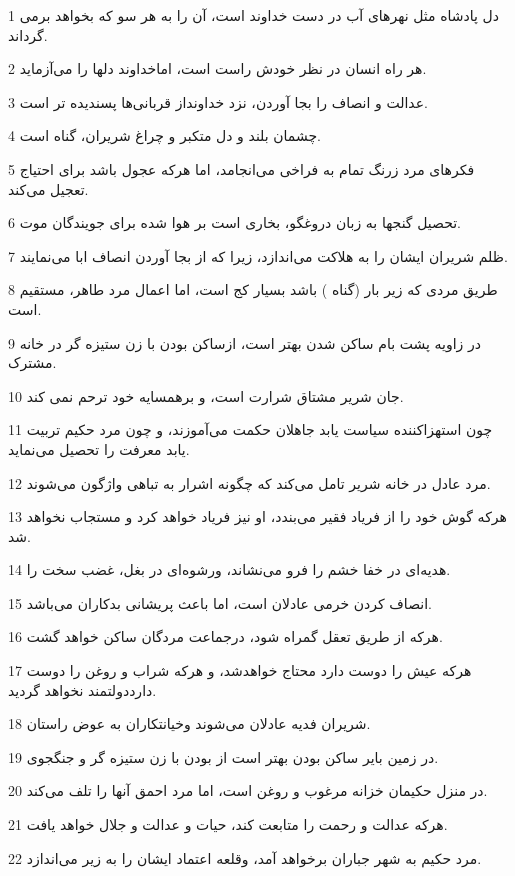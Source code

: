 \par 1 دل پادشاه مثل نهرهای آب در دست خداوند است، آن را به هر سو که بخواهد برمی گرداند.
\par 2 هر راه انسان در نظر خودش راست است، اماخداوند دلها را می‌آزماید.
\par 3 عدالت و انصاف را بجا آوردن، نزد خداونداز قربانی‌ها پسندیده تر است.
\par 4 چشمان بلند و دل متکبر و چراغ شریران، گناه است.
\par 5 فکرهای مرد زرنگ تمام به فراخی می‌انجامد، اما هر‌که عجول باشد برای احتیاج تعجیل می‌کند.
\par 6 تحصیل گنجها به زبان دروغگو، بخاری است بر هوا شده برای جویندگان موت.
\par 7 ظلم شریران ایشان را به هلاکت می‌اندازد، زیرا که از بجا آوردن انصاف ابا می‌نمایند.
\par 8 طریق مردی که زیر بار (گناه ) باشد بسیار کج است، اما اعمال مرد طاهر، مستقیم است.
\par 9 در زاویه پشت بام ساکن شدن بهتر است، ازساکن بودن با زن ستیزه گر در خانه مشترک.
\par 10 جان شریر مشتاق شرارت است، و برهمسایه خود ترحم نمی کند.
\par 11 چون استهزاکننده سیاست یابد جاهلان حکمت می‌آموزند، و چون مرد حکیم تربیت یابد معرفت را تحصیل می‌نماید.
\par 12 مرد عادل در خانه شریر تامل می‌کند که چگونه اشرار به تباهی واژگون می‌شوند.
\par 13 هر‌که گوش خود را از فریاد فقیر می‌بندد، او نیز فریاد خواهد کرد و مستجاب نخواهد شد.
\par 14 هدیه‌ای در خفا خشم را فرو می‌نشاند، ورشوه‌ای در بغل، غضب سخت را.
\par 15 انصاف کردن خرمی عادلان است، اما باعث پریشانی بدکاران می‌باشد.
\par 16 هر‌که از طریق تعقل گمراه شود، درجماعت مردگان ساکن خواهد گشت.
\par 17 هر‌که عیش را دوست دارد محتاج خواهدشد، و هر‌که شراب و روغن را دوست دارددولتمند نخواهد گردید.
\par 18 شریران فدیه عادلان می‌شوند وخیانتکاران به عوض راستان.
\par 19 در زمین بایر ساکن بودن بهتر است از بودن با زن ستیزه گر و جنگجوی.
\par 20 در منزل حکیمان خزانه مرغوب و روغن است، اما مرد احمق آنها را تلف می‌کند.
\par 21 هر‌که عدالت و رحمت را متابعت کند، حیات و عدالت و جلال خواهد یافت.
\par 22 مرد حکیم به شهر جباران برخواهد آمد، وقلعه اعتماد ایشان را به زیر می‌اندازد.
